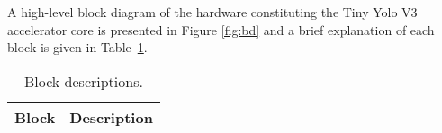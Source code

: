 
A high-level block diagram of the hardware constituting the Tiny Yolo V3 
accelerator core is presented in Figure \ref{fig:bd} and a brief explanation of
each block is given in Table~\ref{tab:blocks}.
\clearpage



\begin{table}[H]
  \centering
    \begin{tabularx}{\textwidth}{ | c | X | }
    \hline
    \rowcolor{iob-green}
    {\bf Block} & {\bf Description} \\ \hline
    
    \end{tabularx}
  \caption{Block descriptions.}
  \label{tab:blocks}
\end{table}
